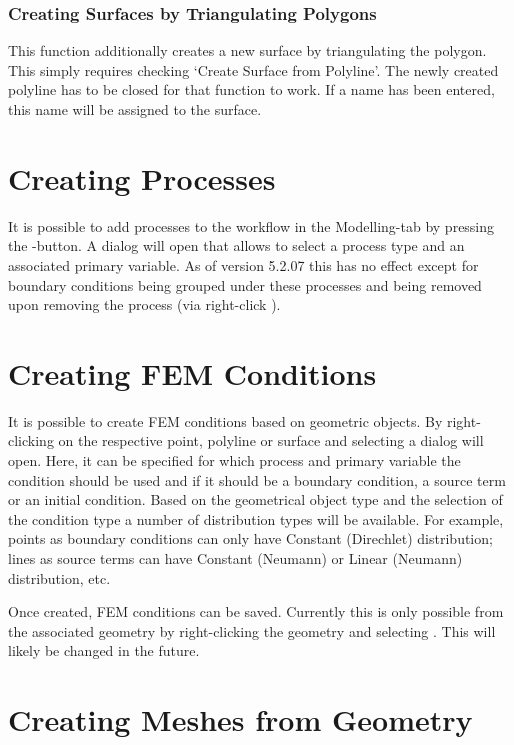 \subsubsection{Creating Surfaces by Triangulating Polygons}
This function additionally creates a new surface by triangulating the polygon. This simply requires checking `Create Surface from Polyline'. The newly created polyline has to be closed for that function to work. If a name has been entered, this name will be assigned to the surface.

\section{Creating Processes}

It is possible to add processes to the workflow in the Modelling-tab by pressing the -button. A dialog will open that allows to select a process type and an associated primary variable. As of version 5.2.07 this has no effect except for boundary conditions being grouped under these processes and being removed upon removing the process (via right-click ).

\section{Creating FEM Conditions}

It is possible to create FEM conditions based on geometric objects. By right-clicking on the respective point, polyline or surface and selecting  a dialog will open. Here, it can be specified for which process and primary variable the condition should be used and if it should be a boundary condition, a source term or an initial condition. Based on the geometrical object type and the selection of the condition type a number of distribution types will be available. For example, points as boundary conditions can only have Constant (Direchlet) distribution; lines as source terms can have Constant (Neumann) or Linear (Neumann) distribution, etc.

Once created, FEM conditions can be saved. Currently this is only possible from the associated geometry by right-clicking the geometry and selecting . This will likely be changed in the future.

\section{Creating Meshes from Geometry}
\label{meshcreation}

